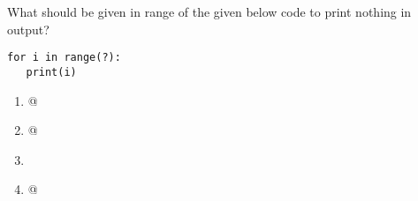 \question
What should be given in range of the given below code to print nothing in output?
\begin{lstlisting}
for i in range(?):
   print(i)
\end{lstlisting}
\begin{enumerate}
\item {}@
\item {}@
\item \lstinline@NULL@
\item {}@
\end{enumerate}

